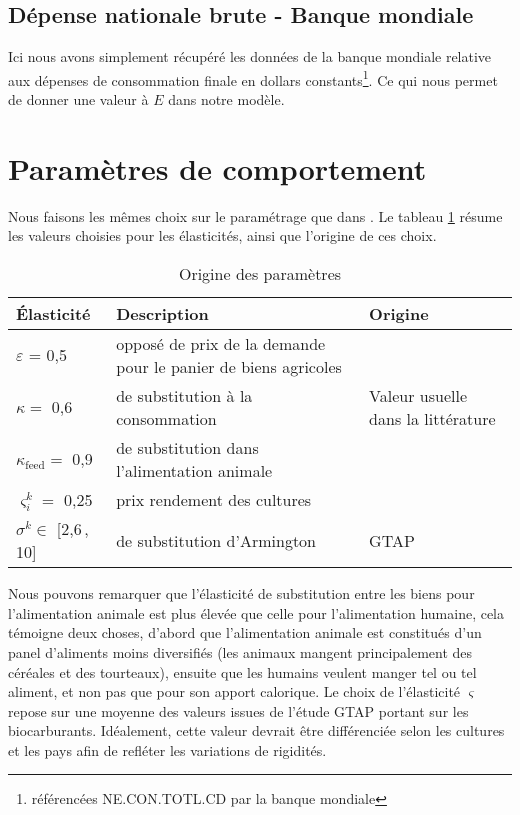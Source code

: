 \subsection{Dépense nationale brute - Banque mondiale}

Ici nous avons simplement récupéré les données de la banque mondiale relative aux dépenses de consommation finale en dollars constants\footnote{référencées NE.CON.TOTL.CD par la banque mondiale}. Ce qui nous permet de donner une valeur à $E$ dans notre modèle.


\section{Paramètres de comportement}
Nous faisons les mêmes choix sur le paramétrage que dans \cite{Gouel2025}. Le tableau \ref{tab:ela} résume les valeurs choisies pour les élasticités, ainsi que l'origine de ces choix.

\begin{table}[hbt!]
    \centering
    \caption{Origine des paramètres}
    \label{tab:ela}
    \begin{tabularx}{\textwidth}{l >{\raggedright\arraybackslash}X >{\raggedright\arraybackslash}X}
        \hline
        \textbf{Élasticité}        & \textbf{Description}                                           & \textbf{Origine}                   \\ \hline
        $\varepsilon$ = 0,5        & opposé de prix de la demande pour le panier de biens agricoles & \cite{Comin2021}                   \\
        $\kappa =$ 0,6             & de substitution à la consommation                              & Valeur usuelle dans la littérature \\
        $\kappa_\text{feed} =$ 0,9 & de substitution dans l'alimentation animale                    & \cite{Rude2000}                    \\
        $\varsigma_i^k =$ 0,25     & prix rendement des cultures                                    & \cite{Keeney2009}                  \\
        $\sigma^k \in$ [2,6\,, 10] & de substitution d'Armington                                    & GTAP  \cite{Aguiar2022}            \\
        \hline
    \end{tabularx}
\end{table}

Nous pouvons remarquer que l'élasticité de substitution entre les biens pour l'alimentation animale est plus élevée que celle pour l'alimentation humaine, cela témoigne deux choses, d'abord que l'alimentation animale est constitués d'un panel d'aliments moins diversifiés (les animaux mangent principalement des céréales et des tourteaux), ensuite que les humains veulent manger tel ou tel aliment, et non pas que pour son apport calorique.
Le choix de l'élasticité $\varsigma$ repose sur une moyenne des valeurs issues de l'étude GTAP \cite{Miller2009} portant sur les biocarburants. Idéalement, cette valeur devrait être différenciée selon les cultures et les pays afin de refléter les variations de rigidités.

